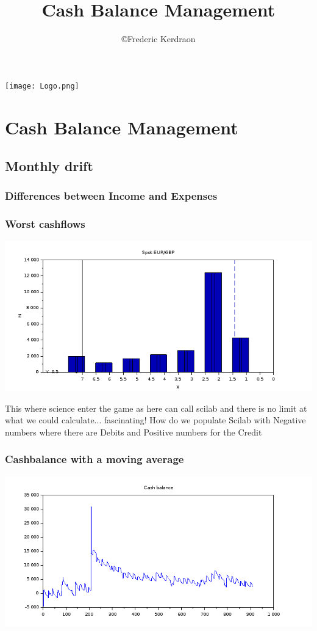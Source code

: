 \documentclass[8pt]{article} %
\title{Cash Balance Management}
\author{\copyright Frederic Kerdraon}
\begin{document}
\maketitle
\hspace*{-1cm}\texttt{[image: Logo.png]}
{\footnotesize

}
\tableofcontents

\section{Cash Balance Management}

\subsection{Monthly drift}

\subsubsection{Differences between Income and Expenses}
%
%


\subsubsection{Worst cashflows}
\includegraphics[scale=0.6]{Vector.png}

This where science enter the game as here can call scilab and there is no limit at what we could calculate... fascinating!
How do we populate Scilab with Negative numbers where there are Debits and Positive numbers for the Credit
\subsubsection{Cashbalance with a moving average}
\includegraphics[scale=0.6]{../Maths/Scilab-cashBalance.png}
\end{document}
